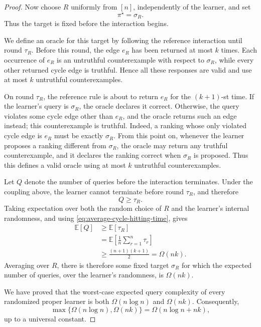 \documentclass[10pt,a4paper]{amsart}
\begin{document}
\begin{proof}
Now choose $R$ uniformly from $[n]$, independently of the learner, and set
\[
    \pi^\star=\sigma_R.
\]
Thus the target is fixed before the interaction begins.

We define an oracle for this target by following the reference interaction
until round $\tau_R$. Before this round, the edge $e_R$ has been returned
at most $k$ times. Each occurrence of $e_R$ is an untruthful counterexample
with respect to $\sigma_R$, while every other returned cycle edge is
truthful. Hence all these responses are valid and use at most $k$
untruthful counterexamples.

On round $\tau_R$, the reference rule is about to return $e_R$ for the
$(k+1)$-st time. If the learner's query is $\sigma_R$, the oracle declares
it correct. Otherwise, the query violates some cycle edge other than
$e_R$, and the oracle returns such an edge instead; this counterexample is
truthful. Indeed, a ranking whose only violated cycle edge is $e_R$ must be
exactly $\sigma_R$. From this point on, whenever the learner proposes a
ranking different from $\sigma_R$, the oracle may return any truthful
counterexample, and it declares the ranking correct when $\sigma_R$ is
proposed. Thus this defines a valid oracle using at most $k$ untruthful
counterexamples.

Let $Q$ denote the number of queries before the interaction terminates.
Under the coupling above, the learner cannot terminate before round
$\tau_R$, and therefore
\[
    Q\geq\tau_R.
\]
Taking expectation over both the random choice of $R$ and the learner's
internal randomness, and using \eqref{eq:average-cycle-hitting-time}, gives
\[
\begin{aligned}
    \mathbb E[Q]
    &\geq \mathbb E[\tau_R] \\
    &= \mathbb E\left[\frac1n\sum_{r=1}^n\tau_r\right] \\
    &\geq \frac{(n+1)(k+1)}2
    = \Omega(nk).
\end{aligned}
\]
Averaging over $R$, there is therefore some fixed target $\sigma_R$ for
which the expected number of queries, over the learner's randomness, is
$\Omega(nk)$.

We have proved that the worst-case expected query complexity of every
randomized proper learner is both $\Omega(n\log n)$ and $\Omega(nk)$.
Consequently,
\[
    \max\{\Omega(n\log n),\Omega(nk)\}
    =
    \Omega(n\log n+nk),
\]
up to a universal constant.
\end{proof}
\end{document}
